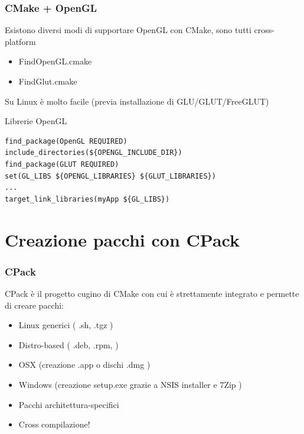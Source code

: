 \documentclass[10pt] {beamer}
\begin{document}

\begin{frame}[fragile]
 \frametitle{CMake + OpenGL}
Esistono diversi modi di supportare OpenGL con CMake, sono tutti cross-platform
\begin{itemize}
 \item FindOpenGL.cmake
 \item FindGlut.cmake
\end{itemize}

Su Linux è molto facile (previa installazione di GLU/GLUT/FreeGLUT)
\begin{block}{Librerie OpenGL}
 \begin{small}
  \begin{verbatim}
find_package(OpenGL REQUIRED)
include_directories(${OPENGL_INCLUDE_DIR})
find_package(GLUT REQUIRED)
set(GL_LIBS ${OPENGL_LIBRARIES} ${GLUT_LIBRARIES})
...
target_link_libraries(myApp ${GL_LIBS})
\end{verbatim}
 \end{small}
\end{block}


\end{frame}


\section{Creazione pacchi con CPack}
\begin{frame}
\frametitle{CPack}
CPack è il progetto cugino di CMake con cui è strettamente integrato e permette di creare pacchi:
\begin{itemize}
\item Linux generici ( .sh, .tgz )
\item Distro-based ( .deb, .rpm, )
\item OSX (creazione .app o dischi .dmg )
\item Windows (creazione setup.exe grazie a NSIS installer e 7Zip )
\end{itemize}
\begin{itemize}
\item Pacchi architettura-specifici
\item Cross compilazione!
\end{itemize}
\end{frame}
\end{document}
